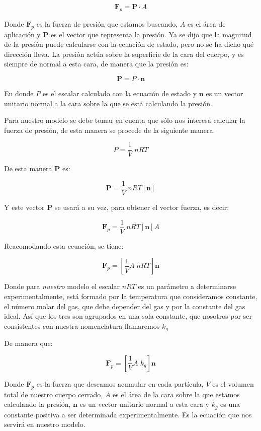 $$ \textbf{F}_p = \textbf{P} \cdot A $$

Donde $\textbf{F}_p$ es la fuerza de presión que estamos buscando, $A$ es el área de aplicación y $\textbf{P}$ es el vector que representa la presión.
Ya se dijo que la magnitud de la presión puede calcularse con la ecuación de estado, pero no se ha dicho qué dirección lleva.
La presión actúa sobre la superficie de la cara del cuerpo, y es siempre de normal a esta cara, de manera que la presión es:

$$ \textbf{P} = P \cdot \textbf{n} $$

En donde $P$ es el escalar calculado con la ecuación de estado y $\textbf{n}$ es un vector unitario normal a la cara sobre la que se está calculando la presión.

Para nuestro modelo se debe tomar en cuenta que sólo nos interesa calcular la fuerza de presión, de esta manera se procede de la siguiente manera.

$$ P = \frac{1}{V} \; nRT $$

De esta manera $\textbf{P}$ es:

$$ \textbf{P} = \frac{1}{V} \; nRT \left[ \textbf{n} \right] $$

Y este vector $\textbf{P}$ se usará a su vez, para obtener el vector fuerza, es decir:

$$ \textbf{F}_p = \frac{1}{V} \; nRT \left[ \textbf{n} \right] A $$

Reacomodando esta ecuación, se tiene:

$$ \textbf{F}_p = \left[ \frac{1}{V}A \; nRT \right] \textbf{n} $$

Donde para \emph{nuestro} modelo el escalar $nRT$ es un parámetro a determinarse experimentalmente, está formado por la temperatura que consideramos constante, el número molar del gas, que debe depender del gas y por la constante del gas ideal. 
Así que los tres son agrupados en una sola constante, que nosotros por ser consistentes con nuestra nomenclatura llamaremos $k_g$

De manera que: 

\begin{equation}
\label{fuerzaGas}
\textbf{F}_p = \left[ \frac{1}{V}A \; k_g \right] \textbf{n}
\end{equation}

Donde $\textbf{F}_p$ es la fuerza que deseamos acumular en cada partícula, $V$ es el volumen total de nuestro cuerpo cerrado, $A$ es el área de la cara sobre la que estamos calculando la presión, $\textbf{n}$ es un vector unitario normal a esta cara y $k_g$ es una constante positiva a ser determinada experimentalmente.
Es la ecuación que nos servirá en nuestro modelo.

